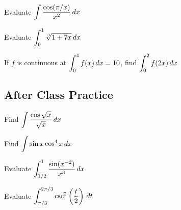 \documentclass[notes]{subfiles}
\begin{document}
			
		\begin{ex}
			Evaluate \(\displaystyle \int \dfrac{\cos (\pi/x)}{x^2}\,dx\)
		\end{ex}
			
		\begin{ex}
			Evaluate \(\displaystyle \int_0^1 \sqrt[3]{1+7x}\, dx\)
		\end{ex}
		
		\begin{ex}
			If \(f\) is continuous at \(\displaystyle \int_0^4 f(x)\, dx = 10\), find \(\displaystyle \int_0^2 f(2x)\, dx\)
		\end{ex}
			\newpage
			
	\subsection*{After Class Practice}		
		\begin{ex}
			Find \(\displaystyle \int \dfrac{\cos \sqrt{x}}{\sqrt{x}}\, dx\)
		\end{ex}
			
		\begin{ex}
			Find \(\displaystyle \int \sin x \cos^4 x\, dx\)
		\end{ex}
			\newpage
			
		\begin{ex}
			Evaluate \(\displaystyle \int_{1/2}^1 \dfrac{\sin (x^{-2})}{x^3}\, dx\)
		\end{ex}
		
		\begin{ex}
			Evaluate \(\displaystyle \int_{\pi/3}^{2\pi/3} \csc^2\left( \dfrac{t}{2}\right)\,dt\)
		\end{ex}
	\clearpage			
\end{document}
